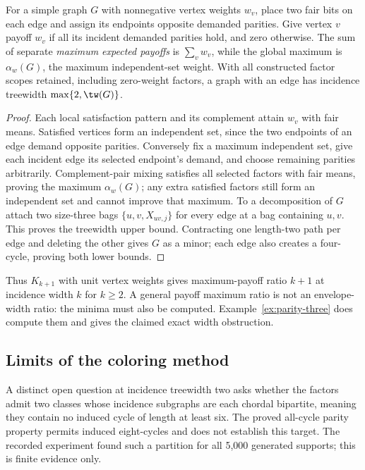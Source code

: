 \begin{proposition}\label{prop:independent-payoffs}
For a simple graph $G$ with nonnegative vertex weights $w_v$, place two
fair bits on each edge and assign its endpoints opposite demanded
parities. Give vertex $v$ payoff $w_v$ if all its incident demanded
parities hold, and zero otherwise. The sum of separate \emph{maximum
expected payoffs} is $\sum_vw_v$, while the global maximum is
$\alpha_w(G)$, the maximum independent-set weight. With all constructed
factor scopes retained, including zero-weight factors, a graph with
an edge has incidence treewidth $\max\{2,\tw(G)\}$.
\end{proposition}
\begin{proof}
Each local satisfaction pattern and its complement attain $w_v$ with
fair means. Satisfied vertices form an independent set, since the two
endpoints of an edge demand opposite parities. Conversely fix a maximum
independent set, give each incident edge its selected endpoint's demand,
and choose remaining parities arbitrarily. Complement-pair mixing
satisfies all selected factors with fair means, proving the maximum
$\alpha_w(G)$; any extra satisfied factors still form an independent
set and cannot improve that maximum.
To a decomposition of $G$ attach two size-three bags $\{u,v,X_{uv,j}\}$
for every edge at a bag containing $u,v$. This proves the treewidth
upper bound. Contracting one length-two path per edge and deleting
the other gives $G$ as a minor; each edge also creates a four-cycle,
proving both lower bounds.
\end{proof}
Thus $K_{k+1}$ with unit vertex weights gives maximum-payoff ratio $k+1$
at incidence width $k$ for $k\ge2$. A general payoff maximum ratio is not an envelope-width
ratio: the minima must also be computed. Example~\ref{ex:parity-three}
does compute them and gives the claimed exact width obstruction.

\subsection{Limits of the coloring method}\label{subsec:width-three-boundary}
A distinct open question at incidence treewidth two asks whether the
factors admit two classes whose incidence subgraphs are each chordal
bipartite, meaning they contain no induced cycle of length at least six.
The proved all-cycle parity property permits induced eight-cycles and
does not establish this target. The recorded experiment found such a
partition for all 5,000 generated supports; this is finite evidence only.

